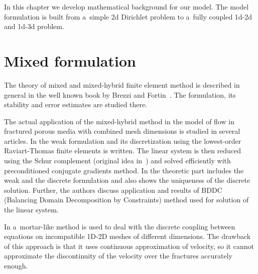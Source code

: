 
% 

In this chapter we develop mathematical background for our model.
The model formulation is built from a~simple 2d Dirichlet problem to a~fully coupled 1d-2d and 1d-3d problem.


\section{Mixed formulation}
The theory of mixed and mixed-hybrid finite element method is described in general in the well known book by 
Brezzi and Fortin~\cite{brezzi_mixed_1991}. 
The formulation, its stability and error estimates are studied there.

The actual application of the mixed-hybrid method in the model of flow in fractured porous 
media with combined mesh dimensions is studied in several articles.
In \cite{brezina_mixed-hybrid_2010} the weak formulation and its discretization using the lowest-order Raviart-Thomas finite 
elements is written. The linear system is then reduced using the Schur complement (original idea in~\cite{maryska_mixed-hybrid_1995})
and solved efficiently with preconditioned conjugate gradients method.
In \cite{sistek_bddc_2015} the theoretic part includes the weak and the discrete formulation and also shows
the uniqueness of the discrete solution. Further, the authors discuss application and results of BDDC 
(Balancing Domain Decomposition by Constraints) method used for solution of the linear system.

In \cite{brezina_2012} a~mortar-like method is used to deal with the discrete coupling between equations on incompatible 1D-2D meshes 
of different dimensions. The drawback of this approach is that it uses continuous approximation of velocity, so
it cannot approximate the discontinuity of the velocity over the fractures accurately enough.


